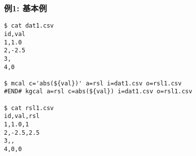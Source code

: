 
\subsubsection*{例1: 基本例}


\begin{Verbatim}[baselinestretch=0.7,frame=single]
$ cat dat1.csv
id,val
1,1.0
2,-2.5
3,
4,0

$ mcal c='abs(${val})' a=rsl i=dat1.csv o=rsl1.csv
#END# kgcal a=rsl c=abs(${val}) i=dat1.csv o=rsl1.csv

$ cat rsl1.csv
id,val,rsl
1,1.0,1
2,-2.5,2.5
3,,
4,0,0
\end{Verbatim}
